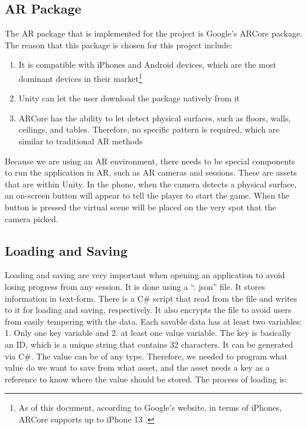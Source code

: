 \subsection{AR Package}

The AR package that is implemented for the project is Google’s ARCore package. The reason that this package is chosen for this project include:
\begin{enumerate}
    \item{It is compatible with iPhones and Android devices, which are the most dominant devices in their market\footnote{As of this document, according to Google’s website, in terms of iPhones, ARCore supports up to iPhone 13 \cite{ARCoreDevices}.}}
    
    \item{Unity can let the user download the package natively from it}
    
    \item{ARCore has the ability to let detect physical surfaces, such as floors, walls, ceilings, and tables. Therefore, no specific pattern is required, which are similar to traditional AR methods}

\end{enumerate}
Because we are using an AR environment, there needs to be special components to run the application in AR, such as AR cameras and sessions. These are assets that are within Unity. In the phone, when the camera detects a physical surface, an on-screen button will appear to tell the player to start the game. When the button is pressed the virtual scene will be placed on the very spot that the camera picked.

\subsection{Loading and Saving}
Loading and saving are very important when opening an application to avoid losing progress from any session. It is done using a “. json” file. It stores information in text-form. There is a C\# script that read from the file and writes to it for loading and saving, respectively. It also encrypts the file to avoid users from easily tempering with the data. Each savable data has at least two variables: 1. Only one key variable and 2. at least one value variable. The key is basically an ID, which is a unique string that contains 32 characters. It can be generated via C\#. The value can be of any type. Therefore, we needed to program what value do we want to save from what asset, and the asset needs a key as a reference to know where the value should be stored. The process of loading is:

